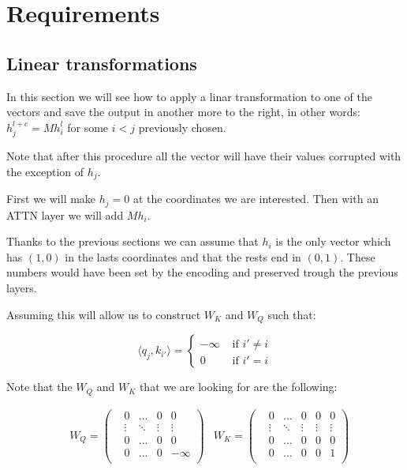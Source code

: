 \section*{Requirements}


\subsection*{Linear transformations}

In this section we will see how to apply a linar transformation to one of the vectors and save the output in another more to the right, in other words: $h_j^{l+c} = M h_i^l$ for some $i < j$ previously chosen.

Note that after this procedure all the vector will have their values corrupted with the exception of $h_j$.

\bigskip

First we will make $h_j = 0$ at the coordinates we are interested. Then with an ATTN layer we will add $M h_i$.

Thanks to the previous sections we can assume that $h_i$ is the only vector which has $(1,0)$ in the lasts coordinates and that the rests end in $(0,1)$. These numbers would have been set by the encoding and preserved trough the previous layers.

Assuming this will allow us to construct $W_K$ and $W_Q$ such that:

\[
\langle q_{j}, k_{i'} \rangle = \begin{cases}
    -\infty &\text{ if } i' \neq i \\
    0  &\text{ if } i' = i 
\end{cases}
\]

Note that the $W_Q$ and $W_K$ that we are looking for are the following:

\begin{align*}
    & W_Q = \left(\begin{matrix}
    &0      &\hdots &0      &0          \\
    &\vdots &\ddots &\vdots &\vdots     \\
    &0      &\hdots &0      &0          \\
    &0      &\hdots &0      &-\infty    \\
\end{matrix}\right)
    &W_K = \left(\begin{matrix}
    &0      &\hdots &0      &0      &0      \\
    &\vdots &\ddots &\vdots &\vdots &\vdots \\
    &0      &\hdots &0      &0      &0      \\
    &0      &\hdots &0      &0      &1      \\
\end{matrix}\right)
\end{align*}



